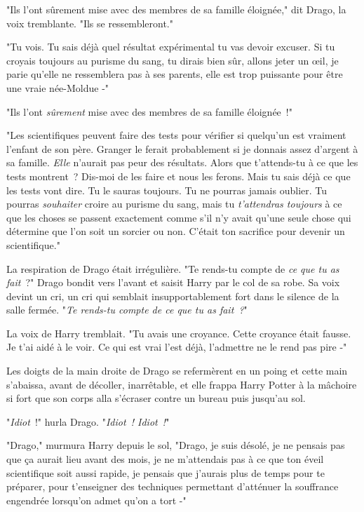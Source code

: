 "Ils l'ont sûrement mise avec des membres de sa famille éloignée," dit Drago, la voix tremblante. "Ils se ressembleront."

"Tu vois. Tu sais déjà quel résultat expérimental tu vas devoir excuser. Si tu croyais toujours au purisme du sang, tu dirais bien sûr, allons jeter un œil, je parie qu'elle ne ressemblera pas à ses parents, elle est trop puissante pour être une vraie née-Moldue -"

"Ils l'ont \emph{sûrement} mise avec des membres de sa famille éloignée~!"

"Les scientifiques peuvent faire des tests pour vérifier si quelqu'un est vraiment l'enfant de son père. Granger le ferait probablement si je donnais assez d'argent à sa famille. \emph{Elle} n'aurait pas peur des résultats. Alors que t'attends-tu à ce que les tests montrent~? Dis-moi de les faire et nous les ferons. Mais tu sais déjà ce que les tests vont dire. Tu le sauras toujours. Tu ne pourras jamais oublier. Tu pourras \emph{souhaiter} croire au purisme du sang, mais tu \emph{t'attendras toujours} à ce que les choses se passent exactement comme s'il n'y avait qu'une seule chose qui détermine que l'on soit un sorcier ou non. C'était ton sacrifice pour devenir un scientifique."

La respiration de Drago était irrégulière. "Te rends-tu compte de \emph{ce que tu as fait}~?" Drago bondit vers l'avant et saisit Harry par le col de sa robe. Sa voix devint un cri, un cri qui semblait insupportablement fort dans le silence de la salle fermée. "\emph{Te rends-tu compte de ce que tu as fait~?}"

La voix de Harry tremblait. "Tu avais une croyance. Cette croyance était fausse. Je t'ai aidé à le voir. Ce qui est vrai l'est déjà, l'admettre ne le rend pas pire -"

Les doigts de la main droite de Drago se refermèrent en un poing et cette main s'abaissa, avant de décoller, inarrêtable, et elle frappa Harry Potter à la mâchoire si fort que son corps alla s'écraser contre un bureau puis jusqu'au sol.

"\emph{Idiot}~!" hurla Drago. "\emph{Idiot~! Idiot~!}"

"Drago," murmura Harry depuis le sol, "Drago, je suis désolé, je ne pensais pas que ça aurait lieu avant des mois, je ne m'attendais pas à ce que ton éveil scientifique soit aussi rapide, je pensais que j'aurais plus de temps pour te préparer, pour t'enseigner des techniques permettant d'atténuer la souffrance engendrée lorsqu'on admet qu'on a tort -"

